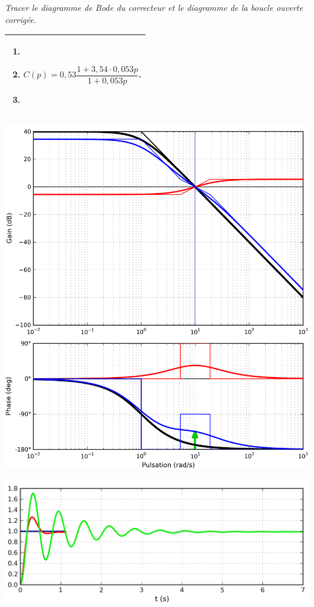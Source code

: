 \documentclass[10pt,fleqn]{article} %
\begin{document}
\begin{multicols}{2}
\subparagraph{}\textit{Tracer le diagramme de Bode du correcteur et le diagramme de la boucle ouverte corrigée.}

\noindent
\begin{tabular}{|p{.9\linewidth}|}
\hline
\begin{enumerate}
\item $\quad$
\item $C(p)=0,53\dfrac{1+3,54 \cdot 0,053  p}{1+0,053 p}$.
\item $\quad$
\end{enumerate}\\
\hline
\end{tabular}
\end{multicols}

\ifprof
\begin{center}
\includegraphics[width=.8\linewidth]{images/AP_BodeC.png}

\includegraphics[width=.8\linewidth]{images/AP_corrige.png}
\end{center}
\end{document}
